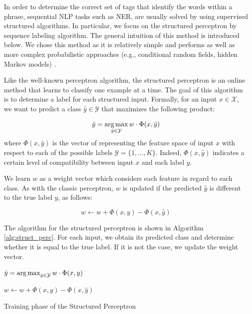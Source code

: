 In order to determine the correct set of tags that identify the words within a phrase, sequential NLP tasks such as NER, are usually solved by using supervised structured algorithms. In particular, we focus on the  structured perceptron by \cite{Collins2002} sequence labeling algorithm. The general intuition of this method is introduced below. We chose this method as it is relatively simple and performs as well as more complex probabilistic approaches (e.g., conditional random fields, hidden Markov models)  \cite{Daume2006,daume2012course}. 




Like  the well-known perceptron algorithm, the structured perceptron is an online method that learns to classify one example at a time. The goal of this algorithm is to determine a label for each structured input. Formally, for an input $x \in \mathcal{X}$, we want to predict a class $\hat{y} \in \mathcal{Y}$ that maximizes the following product: 

\begin{equation}
\hat{y}= \argmax_{\hat{y}\in \mathcal{Y}}w\cdot \Phi(x,\hat{y})
\end{equation}
where $\Phi(x,\hat{y})$ is the vector of representing  the feature space of input  $x$ with respect to each of the  possible labels $\mathcal{Y}=\{1,\dots,\textit{K}\}$. Indeed,  $\Phi(x,\hat{y})$ indicates a certain level of compatibility between input $x$ and each label $y$. 

We learn $w$ as a weight vector which considers each feature in regard to each class. As with the classic perceptron, $w$ is updated if the predicted $\hat{y}$ is different to the true label $y$, as follows: 

\begin{equation}
w \leftarrow w+\Phi(x,y) - \Phi(x,\hat{y})
\end{equation}

The algorithm for the structured perceptron is shown in Algorithm \ref{alg:struct_perc}.  For each input, we obtain its predicted class and determine whether it is equal to the true label. If it is not the case, we update the weight vector.

\begin{algorithm}[htp]
\SetAlgoLined
{}
{
	{
	
		$\hat{y}= \argmax_{\hat{y}\in \mathcal{Y}}w\cdot \Phi(x,y)$
		
		{	
			$w \leftarrow w+\Phi(x,y) - \Phi(x,\hat{y})$
		}
	}
}



\caption{Training phase of the Structured Perceptron}
\label{alg:struct_perc}
\end{algorithm}



